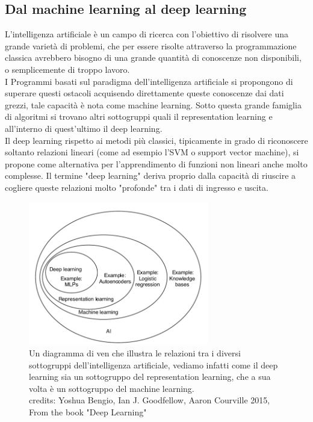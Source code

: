 \subsection{Dal machine learning al deep learning}
L'intelligenza artificiale è un campo di ricerca con l'obiettivo di risolvere una grande varietà di problemi,
 che per essere risolte attraverso la programmazione classica avrebbero bisogno di una grande quantità di conoscenze non disponibili, o semplicemente di troppo lavoro.\\
I Programmi basati sul paradigma dell'intelligenza artificiale si propongono di superare questi ostacoli acquisendo direttamente queste conoscenze 
dai dati grezzi, tale capacità è nota come machine learning.
Sotto questa grande famiglia di algoritmi si trovano altri sottogruppi quali il representation learning e all'interno di quest'ultimo il deep learning.\\ 
Il deep learning rispetto ai metodi più classici, tipicamente in grado di riconoscere soltanto relazioni lineari (come ad esempio l'SVM o support vector machine), 
si propone come alternativa per l'apprendimento di funzioni non lineari anche molto complesse.
Il termine "deep learning" deriva proprio dalla capacità di riuscire a cogliere queste relazioni molto "profonde" tra i dati di ingresso e uscita.

\begin{figure}[H]
    \centering
    \includegraphics[width=0.7\textwidth]{imgs/AI_venn_diagram.png}
    \caption{Un diagramma di ven che illustra le relazioni tra i diversi sottogruppi dell'intelligenza artificiale, vediamo infatti come
    il deep learning sia un sottogruppo del representation learning, che a sua volta è un sottogruppo del machine learning.\\
    credits: Yoshua Bengio, Ian J. Goodfellow, Aaron Courville 2015, From the book "Deep Learning"\\}
    \label{fig:ai_venn_diagram}
\end{figure}

